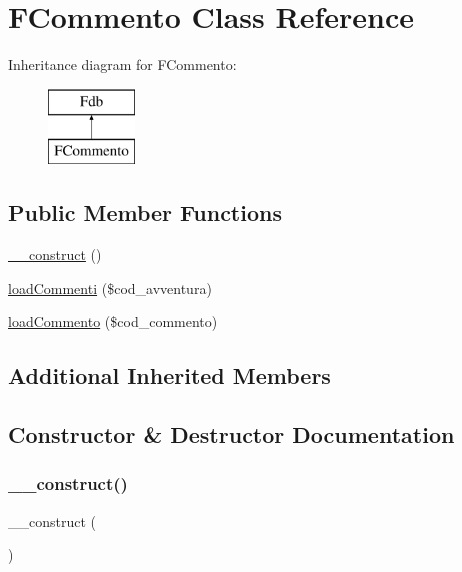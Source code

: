 \hypertarget{class_f_commento}{}\section{F\+Commento Class Reference}
\label{class_f_commento}
Inheritance diagram for F\+Commento\+:\begin{figure}[H]
\begin{center}
\leavevmode
\includegraphics[height=2.000000cm]{class_f_commento}
\end{center}
\end{figure}
\subsection*{Public Member Functions}
\begin{DoxyCompactItemize}
\item 
\mbox{\hyperlink{class_f_commento_a095c5d389db211932136b53f25f39685}{\+\_\+\+\_\+construct}} ()
\item 
\mbox{\hyperlink{class_f_commento_a65cb773599364a81de198c9b419eba69}{load\+Commenti}} (\$cod\+\_\+avventura)
\item 
\mbox{\hyperlink{class_f_commento_aad304f1e51e8522f6b69b74bffc35aec}{load\+Commento}} (\$cod\+\_\+commento)
\end{DoxyCompactItemize}
\subsection*{Additional Inherited Members}


\subsection{Constructor \& Destructor Documentation}
\mbox{\label{class_f_commento_a095c5d389db211932136b53f25f39685}} 
\subsubsection{\texorpdfstring{\+\_\+\+\_\+construct()}{\_\_construct()}}
{\footnotesize\ttfamily \+\_\+\+\_\+construct (\begin{DoxyParamCaption}{ }\end{DoxyParamCaption})}

